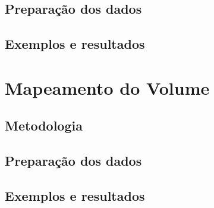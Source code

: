 \subsection{Preparação dos dados}

\subsection{Exemplos e resultados}

\section{Mapeamento do Volume}

\subsection{Metodologia}

\subsection{Preparação dos dados}

\subsection{Exemplos e resultados}


